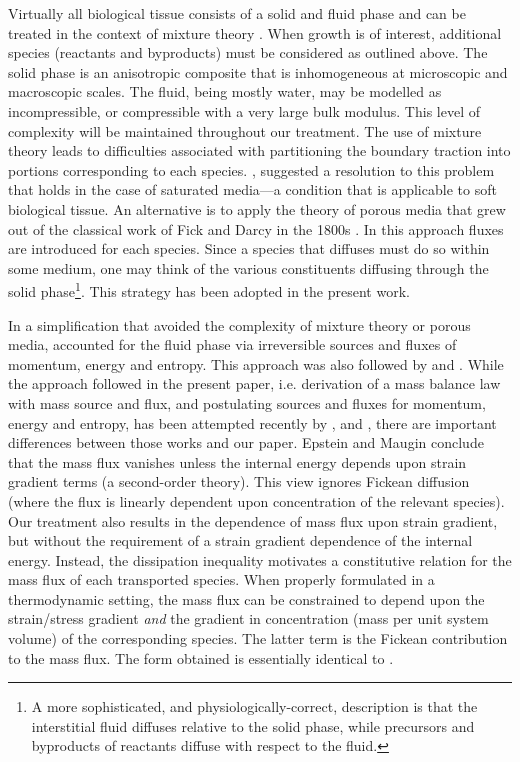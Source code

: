 Virtually all biological tissue consists of a solid and fluid
phase and can be treated in the context of mixture theory
\citep{TruesdellToupin:60,TruesdellNoll:65,BedfordDrumheller:1983}.
When growth is of interest, additional species (reactants and
byproducts) must be considered as outlined above. The solid phase
is an anisotropic composite that is inhomogeneous at microscopic
and macroscopic scales. The fluid, being mostly water, may be
modelled as incompressible, or compressible with a very large bulk
modulus. This level of complexity will be maintained throughout
our treatment. The use of mixture theory leads to difficulties
associated with partitioning the boundary traction into portions
corresponding to each species. \cite{RajagopalWineman:1990},
suggested a resolution to this problem that holds in the case of
saturated media---a condition that is applicable to soft
biological tissue. An alternative is to apply the theory of porous
media that grew out of the classical work of Fick and Darcy in the
1800s \citep{Terzaghi:1943,deBoer:2000}. In this approach fluxes
are introduced for each species. Since a species that diffuses
must do so within some medium, one may think of the various
constituents diffusing through the solid phase\footnote{A more
sophisticated, and physiologically-correct, description is that
the interstitial fluid diffuses relative to the solid phase, while
precursors and byproducts of reactants diffuse with respect to the
fluid.}. This strategy has been adopted in the present work.

In a simplification that avoided the complexity of mixture theory
or porous media, \cite{CowinHegedus:76} accounted for the fluid
phase via irreversible sources and fluxes of momentum, energy and
entropy. This approach was also followed by
\cite{EpsteinMaugin:2000} and \cite{KuhlSteinmann:02}. While the
approach followed in the present paper, i.e. derivation of a mass
balance law with mass source and flux, and postulating sources and
fluxes for momentum, energy and entropy, has been attempted
recently by \cite{EpsteinMaugin:2000}, and
\cite{KuhlSteinmann:02}, there are important differences between
those works and our paper. Epstein and Maugin conclude that the
mass flux vanishes unless the internal energy depends upon strain
gradient terms (a second-order theory). This view ignores Fickean
diffusion (where the flux is linearly dependent upon concentration
of the relevant species). Our treatment also results in the
dependence of mass flux upon strain gradient, but without the
requirement of a strain gradient dependence of the internal
energy. Instead, the dissipation inequality motivates a
constitutive relation for the mass flux of each transported
species. When properly formulated in a thermodynamic setting, the
mass flux can be constrained to depend upon the strain/stress
gradient \emph{and} the gradient in concentration (mass per unit
system volume) of the corresponding species. The latter term is
the Fickean contribution to the mass flux. The form obtained is
essentially identical to \cite{DeGrootMazur:1984}.

